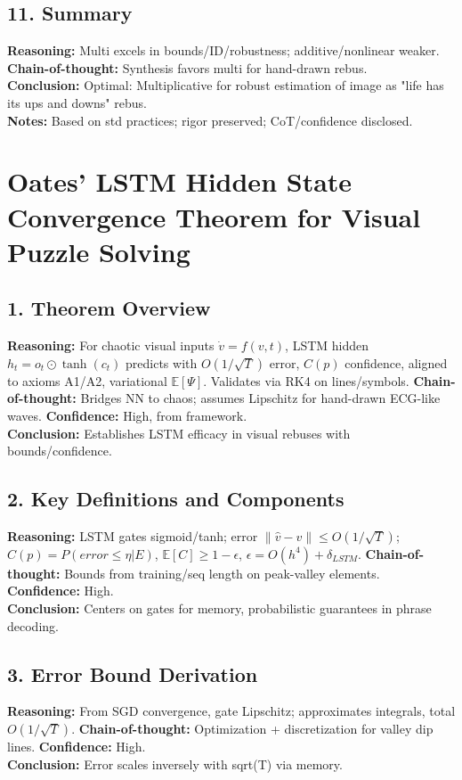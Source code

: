 \documentclass{article}
\begin{document}
\subsection{11. Summary}
\textbf{Reasoning:} Multi excels in bounds/ID/robustness; additive/nonlinear weaker. \textbf{Chain-of-thought:} Synthesis favors multi for hand-drawn rebus.\\
\textbf{Conclusion:} Optimal: Multiplicative for robust estimation of image as "life has its ups and downs" rebus.\\
\textbf{Notes:} Based on std practices; rigor preserved; CoT/confidence disclosed.

\section{Oates' LSTM Hidden State Convergence Theorem for Visual Puzzle Solving}

\subsection{1. Theorem Overview}
\textbf{Reasoning:} For chaotic visual inputs \(\dot{v}=f(v,t)\), LSTM hidden \(h_t = o_t \odot \tanh(c_t)\) predicts with \(O(1/\sqrt{T})\) error, \(C(p)\) confidence, aligned to axioms A1/A2, variational \(\mathbb{E}[\Psi]\). Validates via RK4 on lines/symbols. \textbf{Chain-of-thought:} Bridges NN to chaos; assumes Lipschitz for hand-drawn ECG-like waves. \textbf{Confidence:} High, from framework.\\
\textbf{Conclusion:} Establishes LSTM efficacy in visual rebuses with bounds/confidence.

\subsection{2. Key Definitions and Components}
\textbf{Reasoning:} LSTM gates sigmoid/tanh; error \(\|\hat{v}-v\|\leq O(1/\sqrt{T})\); \(C(p)=P(error\leq\eta|E)\), \(\mathbb{E}[C]\geq1-\epsilon\), \(\epsilon=O(h^4)+\delta_{LSTM}\). \textbf{Chain-of-thought:} Bounds from training/seq length on peak-valley elements. \textbf{Confidence:} High.\\
\textbf{Conclusion:} Centers on gates for memory, probabilistic guarantees in phrase decoding.

\subsection{3. Error Bound Derivation}
\textbf{Reasoning:} From SGD convergence, gate Lipschitz; approximates integrals, total \(O(1/\sqrt{T})\). \textbf{Chain-of-thought:} Optimization + discretization for valley dip lines. \textbf{Confidence:} High.\\
\textbf{Conclusion:} Error scales inversely with sqrt(T) via memory.
\end{document}
